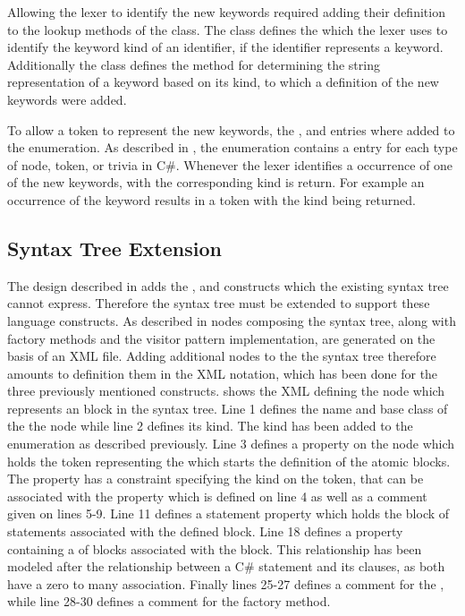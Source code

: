 Allowing the lexer to identify the new keywords required adding their definition to the lookup methods of the  class. The  class defines the  which the lexer uses to identify the keyword kind of an identifier, if the identifier represents a keyword. Additionally the  class defines the  method for determining the string representation of a keyword based on its kind, to which a definition of the new keywords were added.

To allow a token to represent the new keywords, the ,  and  entries where added to the  enumeration. As described in , the  enumeration contains a entry for each type of node, token, or trivia in C\#. Whenever the lexer identifies a occurrence of one of the new keywords, with the corresponding kind is return. For example an occurrence of the  keyword results in a token with the kind  being returned.

\subsection{Syntax Tree Extension}
The design described in  adds the ,  and  constructs which the existing syntax tree cannot express. Therefore the syntax tree must be extended to support these language constructs. As described in  nodes composing the syntax tree, along with factory methods and the visitor pattern implementation, are generated on the basis of an \ac{XML} file. Adding additional nodes to the the syntax tree therefore amounts to definition them in the \ac{XML} notation, which has been done for the three previously mentioned constructs.  shows the \ac{XML} defining the  node which represents an  block in the syntax tree. Line 1 defines the name and base class of the the node while line 2 defines its kind. The  kind has been added to the  enumeration as described previously. Line 3 defines a property on the node which holds the token representing the  which starts the definition of the atomic blocks. The property has a constraint specifying the kind on the token, that can be associated with the property which is defined on line 4 as well as a comment given on lines 5-9. Line 11 defines a statement property which holds the block of statements associated with the defined  block. Line 18 defines a property containing a  of  blocks associated with the  block. This relationship has been modeled after the relationship between a C\#  statement and its  clauses, as both have a zero to many association. Finally lines 25-27 defines a comment for the , while line 28-30 defines a comment for the factory method.

